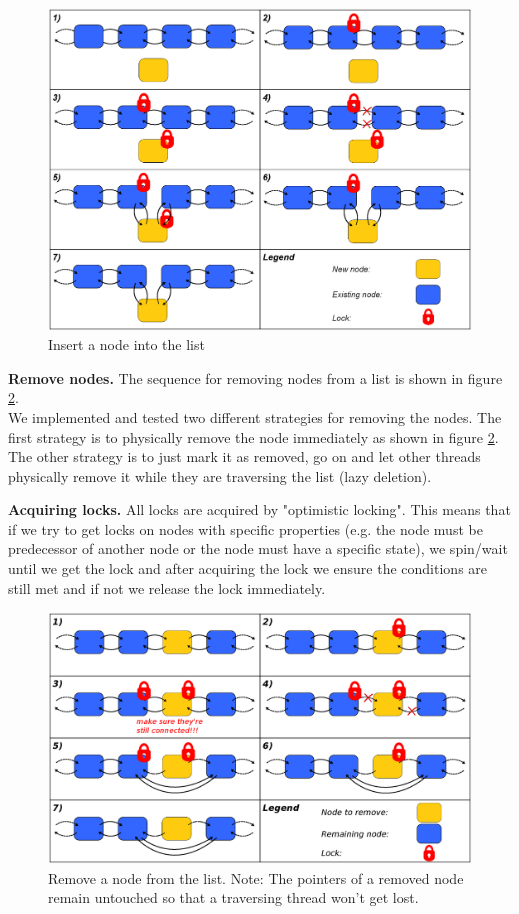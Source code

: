 \documentclass[letterpaper]{article}
\newcommand{\mypar}[1]{{\bf #1.}}
\begin{document}
\begin{figure}[h]\centering
  \includegraphics[scale=0.31]{insert.eps}
  \caption{Insert a node into the list \label{fig:insert}}
\end{figure}

\mypar{Remove nodes}
The sequence for removing nodes from a list is shown in  figure \ref{fig:remove}.\\
We implemented and tested two different strategies for removing the nodes. The first strategy is to physically remove the node immediately as shown in figure \ref{fig:remove}. The other strategy is to just mark it as removed, go on and let other threads physically remove it while they are traversing the list (lazy deletion).

\mypar{Acquiring locks}
All locks are acquired by "optimistic locking". This means that if we try to get locks on nodes with specific properties (e.g. the node must be predecessor of another node or the node must have a specific state), we spin/wait until we get the lock and after acquiring the lock we ensure the conditions are still met and if not we release the lock immediately.

\begin{figure}[h]\centering
  \includegraphics[scale=0.31]{remove.eps}
  \caption{Remove a node from the list. Note: The pointers of a removed node remain untouched so that a traversing thread won't get lost. \label{fig:remove}}
\end{figure}
\end{document}
